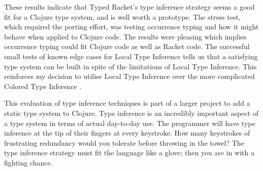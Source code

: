 \documentclass[12pt,a4paper]{article}
\begin{document}
These results indicate that Typed Racket's type inference strategy \cite{SAMTH:dissertation} seems a good
fit for a Clojure type system, and is well worth a prototype. The stress test,
which required the porting effort, was testing occurrence typing and
how it might behave when applied to Clojure code. The results
were pleasing which implies occurrence typing could fit Clojure code as well as
Racket code. The successful small tests of known edge cases for Local Type Inference tells us
that a satisfying type system can be built in spite of the limitations of Local Type Inference\cite{Hosoya99howgood}.
This reinforces my decision to utilise Local Type Inference \cite{Pierce:2000:LTI:345099.345100}
over the more complicated Colored Type Inference \cite{Odersky:2001:CLT:373243.360207}.

This evaluation of type inference techniques is part of a larger project to add a static
type system to Clojure. Type inference is an incredibly important aspect of a type system in terms
of actual day-to-day use. The programmer will have type inference at the tip of their fingers
at every keystroke. How many keystrokes of frustrating redundancy would you tolerate 
before throwing in the towel? The type inference strategy must fit the language like a glove; then
you are in with a fighting chance.

%

\printbibliography
\end{document}
